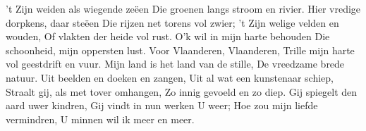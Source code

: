 \beginverse*
't Zijn weiden als wiegende zeëen
Die groenen langs stroom en rivier.
Hier vredige dorpkens, daar steëen
Die rijzen net torens vol zwier;
't Zijn welige velden en wouden,
Of vlakten der heide vol rust.
O'k wil in mijn harte behouden
Die schoonheid, mijn oppersten lust.
\endverse
\beginchorus
Voor Vlaanderen, Vlaanderen,
Trille mijn harte vol geestdrift en vuur.
Mijn land is het land van de stille,
De vreedzame brede natuur.
\endchorus
\beginverse*
Uit beelden en doeken en zangen,
Uit al wat een kunstenaar schiep,
Straalt gij, als met tover omhangen,
Zo innig gevoeld en zo diep.
Gij spiegelt den aard uwer kindren,
Gij vindt in nun werken U weer;
Hoe zou mijn liefde vermindren,
U minnen wil ik meer en meer.
\endverse
\endsong